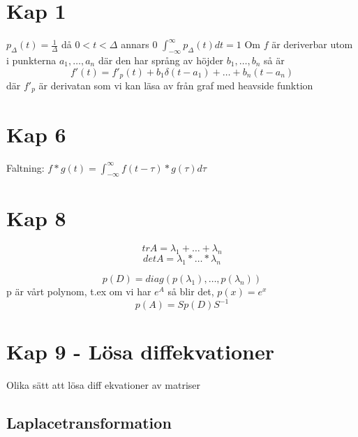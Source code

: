 \documentclass[twocolumn,a4paper]{article}
\begin{document}
\section*{Kap 1}

$p_{\Delta}(t) = \frac{1}{\Delta}$ då $0<t<\Delta$ annars 0
$\int^{\infty}_{-\infty} p_{\Delta}(t) dt = 1$
\newline
\newline
Om $f$ är deriverbar utom i punkterna $a_1, \ldots, a_n$ där den har språng av höjder $b_1,\ldots,b_n$ så är
\begin{equation}
    f'(t) = f'_p(t) + b_1\delta(t-a_1)+\ldots+b_n(t-a_n)
\end{equation}
där $f'_p$ är derivatan som vi kan läsa av från graf med heavside funktion

\section*{Kap 6}
Faltning: $f \ast g(t) = \int_{-\infty}^{\infty} f(t-\tau)*g(\tau) d\tau$

\section*{Kap 8}
\begin{equation}
    tr A = \lambda_1 + \ldots + \lambda_n    
\end{equation}
\begin{equation}
    det A = \lambda_1 * \ldots *\lambda_n    
\end{equation}


\begin{equation}
    p(D) = diag(p(\lambda_1),\ldots,p(\lambda_n))
\end{equation}
p är vårt polynom, t.ex om vi har $e^A$ så blir det, $p(x) = e^x$
\begin{equation}
    p(A) = Sp(D)S^{-1}
\end{equation}
\section*{Kap 9 - Lösa diffekvationer}
Olika sätt att lösa diff ekvationer av matriser
\subsection*{ Laplacetransformation}
\end{document}
